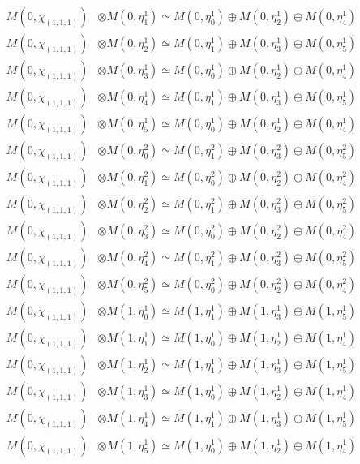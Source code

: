 \begin{align*}
M(0,\chi_{(1,1,1)}) &\otimes M(0,\eta^{1}_{1}) \simeq M(0,\eta^{1}_{0}) \oplus M(0,\eta^{1}_{2}) \oplus M(0,\eta^{1}_{4}) \\
M(0,\chi_{(1,1,1)}) &\otimes M(0,\eta^{1}_{2}) \simeq M(0,\eta^{1}_{1}) \oplus M(0,\eta^{1}_{3}) \oplus M(0,\eta^{1}_{5}) \\
M(0,\chi_{(1,1,1)}) &\otimes M(0,\eta^{1}_{3}) \simeq M(0,\eta^{1}_{0}) \oplus M(0,\eta^{1}_{2}) \oplus M(0,\eta^{1}_{4}) \\
M(0,\chi_{(1,1,1)}) &\otimes M(0,\eta^{1}_{4}) \simeq M(0,\eta^{1}_{1}) \oplus M(0,\eta^{1}_{3}) \oplus M(0,\eta^{1}_{5}) \\
M(0,\chi_{(1,1,1)}) &\otimes M(0,\eta^{1}_{5}) \simeq M(0,\eta^{1}_{0}) \oplus M(0,\eta^{1}_{2}) \oplus M(0,\eta^{1}_{4}) \\
M(0,\chi_{(1,1,1)}) &\otimes M(0,\eta^{2}_{0}) \simeq M(0,\eta^{2}_{1}) \oplus M(0,\eta^{2}_{3}) \oplus M(0,\eta^{2}_{5}) \\
M(0,\chi_{(1,1,1)}) &\otimes M(0,\eta^{2}_{1}) \simeq M(0,\eta^{2}_{0}) \oplus M(0,\eta^{2}_{2}) \oplus M(0,\eta^{2}_{4}) \\
M(0,\chi_{(1,1,1)}) &\otimes M(0,\eta^{2}_{2}) \simeq M(0,\eta^{2}_{1}) \oplus M(0,\eta^{2}_{3}) \oplus M(0,\eta^{2}_{5}) \\
M(0,\chi_{(1,1,1)}) &\otimes M(0,\eta^{2}_{3}) \simeq M(0,\eta^{2}_{0}) \oplus M(0,\eta^{2}_{2}) \oplus M(0,\eta^{2}_{4}) \\
M(0,\chi_{(1,1,1)}) &\otimes M(0,\eta^{2}_{4}) \simeq M(0,\eta^{2}_{1}) \oplus M(0,\eta^{2}_{3}) \oplus M(0,\eta^{2}_{5}) \\
M(0,\chi_{(1,1,1)}) &\otimes M(0,\eta^{2}_{5}) \simeq M(0,\eta^{2}_{0}) \oplus M(0,\eta^{2}_{2}) \oplus M(0,\eta^{2}_{4}) \\
M(0,\chi_{(1,1,1)}) &\otimes M(1,\eta^{1}_{0}) \simeq M(1,\eta^{1}_{1}) \oplus M(1,\eta^{1}_{3}) \oplus M(1,\eta^{1}_{5}) \\
M(0,\chi_{(1,1,1)}) &\otimes M(1,\eta^{1}_{1}) \simeq M(1,\eta^{1}_{0}) \oplus M(1,\eta^{1}_{2}) \oplus M(1,\eta^{1}_{4}) \\
M(0,\chi_{(1,1,1)}) &\otimes M(1,\eta^{1}_{2}) \simeq M(1,\eta^{1}_{1}) \oplus M(1,\eta^{1}_{3}) \oplus M(1,\eta^{1}_{5}) \\
M(0,\chi_{(1,1,1)}) &\otimes M(1,\eta^{1}_{3}) \simeq M(1,\eta^{1}_{0}) \oplus M(1,\eta^{1}_{2}) \oplus M(1,\eta^{1}_{4}) \\
M(0,\chi_{(1,1,1)}) &\otimes M(1,\eta^{1}_{4}) \simeq M(1,\eta^{1}_{1}) \oplus M(1,\eta^{1}_{3}) \oplus M(1,\eta^{1}_{5}) \\
M(0,\chi_{(1,1,1)}) &\otimes M(1,\eta^{1}_{5}) \simeq M(1,\eta^{1}_{0}) \oplus M(1,\eta^{1}_{2}) \oplus M(1,\eta^{1}_{4}) \\
\end{align*}

